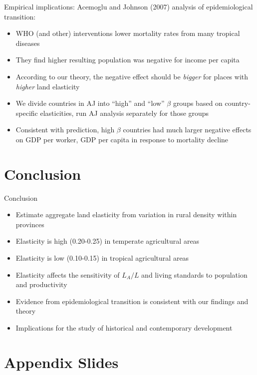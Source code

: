 \documentclass[10pt, xcolor=dvipsnames]{beamer}
\begin{document}
\begin{frame}{Empirical implications:}\label{aj}
Acemoglu and Johnson (2007) analysis of epidemiological transition:
\begin{itemize}
  \item WHO (and other) interventions lower mortality rates from many tropical diseases
  \item They find higher resulting population was negative for income per capita
  \item According to our theory, the negative effect should be \textit{bigger} for places with \textit{higher} land elasticity
  \item We divide countries in AJ into ``high'' and ``low'' $\beta$ groups based on country-specific elasticities, run AJ analysis separately for those groups
  \item Consistent with prediction, high $\beta$ countries had much larger negative effects on GDP per worker, GDP per capita in response to mortality decline
\end{itemize}

\hfill \hyperlink{mortality}{}
\end{frame}

\section{Conclusion}

\begin{frame}{Conclusion}
\begin{itemize}
  \item Estimate aggregate land elasticity from variation in rural density within provinces
  \item Elasticity is high (0.20-0.25) in temperate agricultural areas 
  \item Elasticity is low (0.10-0.15) in tropical agricultural areas 
  \item Elasticity affects the sensitivity of $L_A/L$ and living standards to population and productivity
  \item Evidence from epidemiological transition is consistent with our findings and theory
  \item Implications for the study of historical and contemporary development
\end{itemize}
\end{frame}

\section{Appendix Slides}
\appendix
\end{document}
